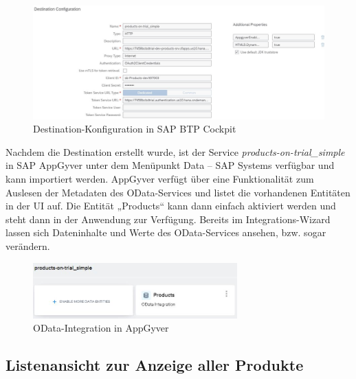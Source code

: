 \begin{figure}[htbp]
 \centering
 \includegraphics[width=1.0\textwidth]{Bilder/appgyver/3_10_destination.jpg}
 \caption{Destination-Konfiguration in SAP BTP Cockpit}
\end{figure}

Nachdem die Destination erstellt wurde, ist der Service \textit{products-on-trial\_simple} in SAP AppGyver unter dem Menüpunkt Data – SAP Systems verfügbar und kann importiert werden. AppGyver verfügt über eine Funktionalität zum Auslesen der Metadaten des OData-Services und listet die vorhandenen Entitäten in der UI auf. Die Entität „Products“ kann dann einfach aktiviert werden und steht dann in der Anwendung zur Verfügung. Bereits im Integrations-Wizard lassen sich Dateninhalte und Werte des OData-Services ansehen, bzw. sogar verändern.

\begin{figure}[htbp]
 \centering
 \includegraphics[width=0.7\textwidth]{Bilder/appgyver/3_11_odata integration_in_AppGyver.jpg}
 \caption{OData-Integration in AppGyver}
\end{figure}

\subsection{Listenansicht zur Anzeige aller Produkte}

